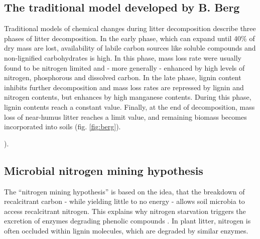 \subsection{The traditional model developed by B. Berg}

Traditional models of chemical changes during litter decomposition describe three phases of litter decomposition. In the early phase, which can expand until 40\% of dry mass are lost, availability of labile carbon sources like soluble compounds and non-lignified carbohydrates is high. In this phase, mass loss rate were usually found to be nitrogen limited and - more generally - enhanced by high levels of nitrogen, phosphorous and dissolved carbon. In the late phase, lignin content inhibits further decomposition and mass loss rates are repressed by lignin and nitrogen contents, but enhances by high manganese contents. During this phase, lignin contents reach a constant value. Finally, at the end of decomposition, mass loss of near-humus litter reaches a limit value, and remaining biomass becomes incorporated into soils (fig. \ref{fig:berg}). 

\cite{Berg2008}).

\subsection{Microbial nitrogen mining hypothesis}

The “nitrogen mining hypothesis” is based on the idea, that the breakdown of recalcitrant carbon - while yielding little to no energy - allows soil microbia to access recalcitrant nitrogen. This explains why nitrogen starvation triggers the excretion of enzymes degrading phenolic compounds \citep{Craine2007}. In plant litter, nitrogen is often occluded within lignin molecules, which are degraded by similar enzymes. 


